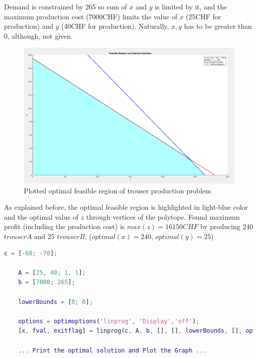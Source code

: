 \documentclass[unicode,11pt,a4paper,oneside,numbers=endperiod,openany]{scrartcl}
\begin{document}
Demand is constrained by 265 so sum of ${x}$ and ${y}$ is limited by it, and the maximum production cost (7000CHF) limits the value of ${x}$ (25CHF for production) and ${y}$ (40CHF for production). Naturally, ${x, y}$ has to be greater than 0, although, not given. \\

\begin{figure}[h!]
    \begin{minipage}[c]{1\linewidth}
        \centering
        \includegraphics[width=0.9\linewidth]{./figure2.png}
    \end{minipage}
    \caption{Plotted optimal feasible region of trouser production problem}
\end{figure}

As explained before, the optimal feasible region is highlighted in light-blue color and the optimal value of ${z}$ through vertices of the polytope. Found maximum profit (including the production cost) is ${max(z) = 16150 CHF}$ by producing 240 ${trouserA}$ and 25 ${trouserB}$. (${optimal(x)=240}$, ${optimal(y)=25}$) \\


\begin{lstlisting}[language=Matlab]
    c = [-60; -70];

    A = [25, 40; 1, 1];
    b = [7000; 265];

    lowerBounds = [0; 0];

    options = optimoptions('linprog', 'Display','off');
    [x, fval, exitflag] = linprog(c, A, b, [], [], lowerBounds, [], options);
    
    ... Print the optimal solution and Plot the Graph ...
\end{lstlisting}

\vspace{20px}
\end{document}
